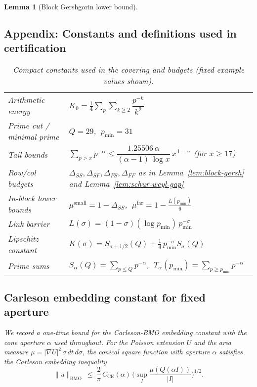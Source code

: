 \documentclass[11pt]{article}
\newtheorem{lemma}{Lemma}[section]
\theoremstyle{definition}
\theoremstyle{remark}
\begin{document}
\begin{lemma}[Block Gershgorin lower bound]
\vspace{1.0cm}
\subsection*{Appendix: Constants and definitions used in certification}

\begin{table}[H]
\centering
\caption{Compact constants used in the covering and budgets (fixed example values shown).}
\begin{tabular}{l l}
\toprule
Arithmetic energy & $K_0=\tfrac14\sum_{p}\sum_{k\ge2} \dfrac{p^{-k}}{k^2}$ \\ 
Prime cut / minimal prime & $Q=29$, $\ p_{\min}=31$ \\ 
Tail bounds & $\sum_{p>x}p^{-\alpha} \le \dfrac{1.25506\,\alpha}{(\alpha-1)\,\log x}\,x^{\,1-\alpha}$ (for $x\ge 17$) \\ 
Row/col budgets & $\Delta_{SS},\Delta_{SF},\Delta_{FS},\Delta_{FF}$ as in Lemma~\ref{lem:block-gersh} and Lemma~\ref{lem:schur-weyl-gap} \\ 
In-block lower bounds & $\mu^{\mathrm{small}}=1-\Delta_{SS}$, $\ \mu^{\mathrm{far}}=1-\tfrac{L(p_{\min})}{6}$ \\ 
Link barrier & $L(\sigma)=(1-\sigma)(\log p_{\min})\,p_{\min}^{-\sigma}$ \\ 
Lipschitz constant & $K(\sigma)=S_{\sigma+1/2}(Q)+\tfrac14\,p_{\min}^{-\sigma}S_{\sigma}(Q)$ \\ 
Prime sums & $S_{\alpha}(Q)=\sum_{p\le Q} p^{-\alpha}$, $\ T_{\alpha}(p_{\min})=\sum_{p\ge p_{\min}} p^{-\alpha}$ \\ 
\bottomrule
\end{tabular}
\end{table}









\subsection{Carleson embedding constant for fixed aperture}
\label{app:CE-constant}
We record a one-time bound for the Carleson-BMO embedding constant with the cone aperture $\alpha$ used throughout. For the Poisson extension $U$ and the area measure $\mu=|\nabla U|^2\,\sigma\,dt\,d\sigma$, the conical square function with aperture $\alpha$ satisfies the Carleson embedding inequality
\[
  \|u\|_{\mathrm{BMO}}\ \le\ \frac{2}{\pi}\,C_{\mathrm{CE}}(\alpha)\,\Big(\sup_I \frac{\mu(Q(\alpha I))}{|I|}\Big)^{\!1/2}.
\]






\end{lemma}
\end{document}
